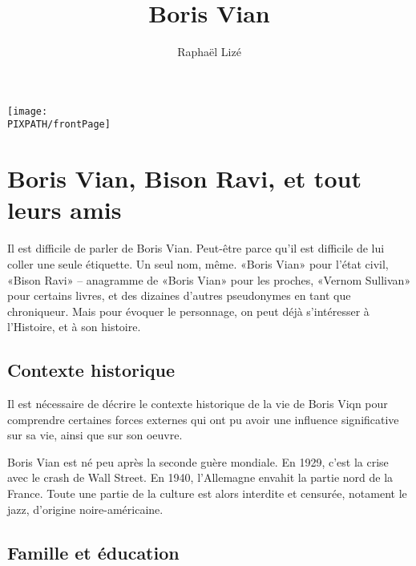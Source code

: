 \documentclass[twoside]{book}
\title{Boris Vian}
\author{Raphaël Lizé}
\newcommand\PIXPATH{./docs/pics}
\begin{document}


\thispagestyle{empty}

\maketitle

\begin{center}
    \texttt{[image: \\PIXPATH/frontPage]}
\end{center}

\vfill
\pagebreak

\tableofcontents
\vfill
\pagebreak



\section{Boris Vian, Bison Ravi, et tout leurs amis}


Il est difficile de parler de Boris Vian. Peut-être parce qu'il
est difficile de lui coller une seule étiquette. Un seul nom,
même. «Boris Vian» pour l'état civil, «Bison Ravi» -- anagramme
de «Boris Vian» pour les proches, «Vernom Sullivan» pour certains
livres, et des dizaines d'autres pseudonymes en tant que chroniqueur.
Mais pour évoquer le personnage, on peut déjà s'intéresser à l'Histoire,
et à son histoire.

\subsection{Contexte historique}
Il est nécessaire de décrire le contexte historique de la vie
de Boris Viqn pour comprendre certaines forces externes qui
ont pu avoir une influence significative sur sa vie, ainsi que
sur son oeuvre.

Boris Vian est né peu après la seconde guère mondiale. En 1929, c'est
la crise avec le crash de Wall Street. En 1940, l'Allemagne envahit la
partie nord de la France. Toute une partie de la culture est alors
interdite et censurée, notament le jazz, d'origine noire-américaine.

\subsection{Famille et éducation}
\end{document}

